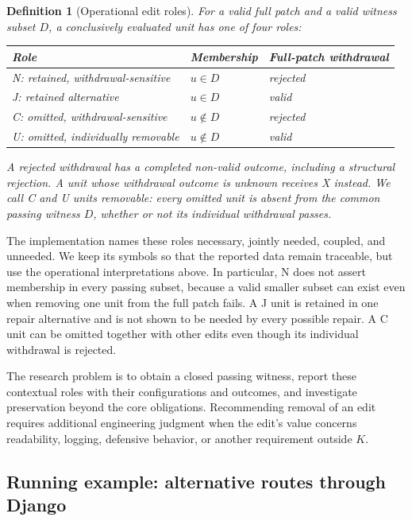 \documentclass[a4paper,fleqn]{cas-sc}
\newcommand{\lab}[1]{\textsf{#1}}
\newtheorem{definition}{Definition}
\begin{document}
\begin{definition}[Operational edit roles]\label{def:roles}
For a valid full patch and a valid witness subset $D$, a conclusively evaluated unit has one of four roles:
\begin{center}
\begin{tabular}{lll}
\toprule
Role & Membership & Full-patch withdrawal \\
\midrule
\lab{N}: retained, withdrawal-sensitive & $u\in D$ & rejected \\
\lab{J}: retained alternative & $u\in D$ & valid \\
\lab{C}: omitted, withdrawal-sensitive & $u\notin D$ & rejected \\
\lab{U}: omitted, individually removable & $u\notin D$ & valid \\
\bottomrule
\end{tabular}
\end{center}
A rejected withdrawal has a completed non-valid outcome, including a structural rejection. A unit whose withdrawal outcome is unknown receives \lab{X} instead. We call \lab{C} and \lab{U} units \emph{removable}: every omitted unit is absent from the common passing witness $D$, whether or not its individual withdrawal passes.
\end{definition}

The implementation names these roles necessary, jointly needed, coupled, and unneeded. We keep its symbols so that the reported data remain traceable, but use the operational interpretations above. In particular, \lab{N} does not assert membership in every passing subset, because a valid smaller subset can exist even when removing one unit from the full patch fails. A \lab{J} unit is retained in one repair alternative and is not shown to be needed by every possible repair. A \lab{C} unit can be omitted together with other edits even though its individual withdrawal is rejected.

The research problem is to obtain a closed passing witness, report these contextual roles with their configurations and outcomes, and investigate preservation beyond the core obligations. Recommending removal of an edit requires additional engineering judgment when the edit's value concerns readability, logging, defensive behavior, or another requirement outside $K$.

\subsection{Running example: alternative routes through Django}\label{sec:running}
\end{document}
